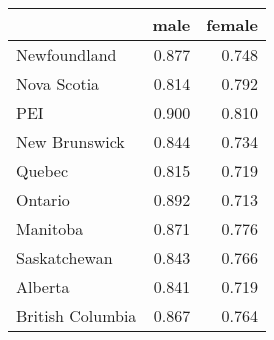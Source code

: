 \begin{tabular}{lrr}
\toprule
{} &   male &  female \\
\midrule
Newfoundland     &  0.877 &   0.748 \\
Nova Scotia      &  0.814 &   0.792 \\
PEI              &  0.900 &   0.810 \\
New Brunswick    &  0.844 &   0.734 \\
Quebec           &  0.815 &   0.719 \\
Ontario          &  0.892 &   0.713 \\
Manitoba         &  0.871 &   0.776 \\
Saskatchewan     &  0.843 &   0.766 \\
Alberta          &  0.841 &   0.719 \\
British Columbia &  0.867 &   0.764 \\
\bottomrule
\end{tabular}
